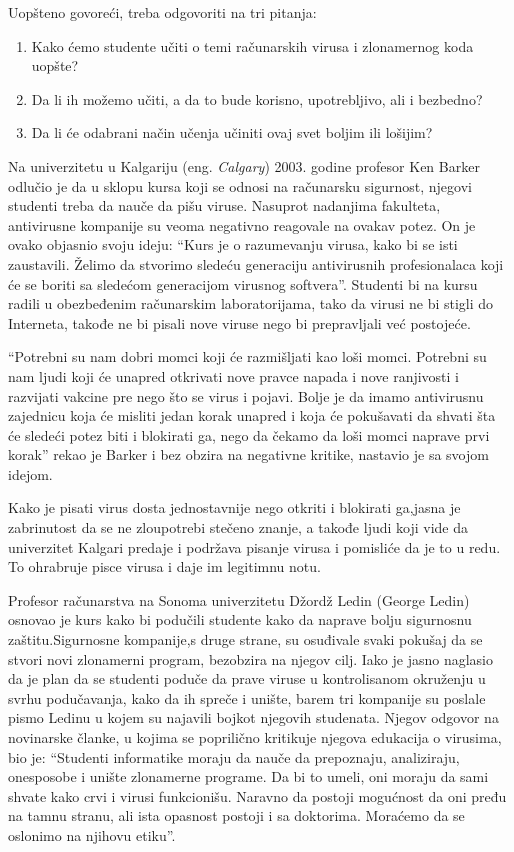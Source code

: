 \documentclass[a4paper]{article}
\begin{document}
Uopšteno govoreći, treba odgovoriti na tri pitanja:
\begin{enumerate}
	\item Kako ćemo studente učiti o temi računarskih virusa i zlonamernog koda uopšte?
	\item Da li ih možemo učiti, a da to bude korisno, upotrebljivo, ali i bezbedno?
	\item Da li će odabrani način učenja učiniti ovaj svet boljim ili lošijim?
\end{enumerate}

Na univerzitetu u Kalgariju (eng. \textit{Calgary}) 2003. godine profesor Ken Barker odlučio je da u sklopu kursa koji se odnosi na računarsku sigurnost, njegovi
studenti treba da nauče da pišu viruse. Nasuprot nadanjima fakulteta, antivirusne kompanije su veoma negativno reagovale na ovakav potez.
On je ovako objasnio svoju ideju: ``Kurs je o razumevanju virusa, kako bi se isti zaustavili.
Želimo da stvorimo sledeću generaciju antivirusnih profesionalaca koji će se boriti sa sledećom generacijom virusnog softvera''.
Studenti bi na kursu radili u obezbeđenim računarskim laboratorijama, tako da virusi ne bi stigli do Interneta, takođe ne bi pisali nove viruse nego 
bi prepravljali već postojeće.

``Potrebni su nam dobri momci koji će razmišljati kao loši momci. Potrebni su nam ljudi koji će unapred otkrivati nove pravce napada i nove ranjivosti i razvijati vakcine pre nego što se virus i pojavi.
Bolje je da imamo antivirusnu zajednicu koja će misliti jedan korak unapred i koja će pokušavati da shvati šta će sledeći potez biti i blokirati ga, nego da čekamo da loši momci naprave prvi korak''
rekao je Barker i bez obzira na negativne kritike, nastavio je sa svojom idejom.

Kako je pisati virus dosta jednostavnije nego otkriti i blokirati ga,jasna je zabrinutost da se ne zloupotrebi stečeno znanje, a takođe ljudi koji vide da univerzitet Kalgari predaje i podržava pisanje virusa i pomisliće da je to u redu. 
To ohrabruje pisce virusa i daje im legitimnu notu.

Profesor računarstva na Sonoma univerzitetu Džordž Ledin (George Ledin) osnovao je kurs kako bi podučili studente kako da naprave bolju sigurnosnu zaštitu.Sigurnosne kompanije,s druge strane, su osuđivale
svaki pokušaj da se stvori novi zlonamerni program, bezobzira na njegov cilj. Iako je jasno naglasio da je plan da se studenti poduče da prave viruse u kontrolisanom okruženju u svrhu podučavanja, kako da
ih spreče i unište, barem tri kompanije su poslale pismo Ledinu u kojem su najavili bojkot njegovih studenata.
Njegov odgovor na novinarske članke, u kojima se poprilično kritikuje njegova edukacija o virusima, bio je: ``Studenti informatike moraju da nauče da prepoznaju, analiziraju, onesposobe i unište zlonamerne programe.
Da bi to umeli, oni moraju da sami shvate kako crvi i virusi funkcionišu. Naravno da postoji mogućnost da oni pređu na tamnu stranu, ali ista opasnost postoji i sa doktorima. Moraćemo da se oslonimo na njihovu etiku''.
\end{document}
